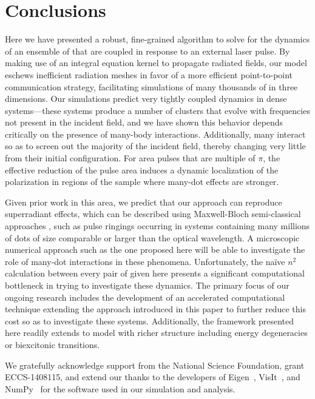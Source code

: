 \section{\label{section:conclusion}Conclusions}
Here we have presented a robust, fine-grained algorithm to solve for the dynamics of an ensemble of \qds{} that are coupled in response to an external laser pulse.
By making use of an integral equation kernel to propagate radiated fields, our model eschews inefficient radiation meshes in favor of a more efficient point-to-point communication strategy, facilitating simulations of many thousands of \qds{} in three dimensions.
Our simulations predict very tightly coupled dynamics in dense \qd{} systems---these systems produce a number of clusters that evolve with frequencies not present in the incident field, and we have shown this behavior depends critically on the presence of many-body interactions.
Additionally, many \qds{} interact so as to screen out the majority of the incident field, thereby changing very little from their initial configuration. For area pulses that are multiple of $\pi$, the effective reduction of the pulse area induces a dynamic localization of the polarization in regions of the sample where many-dot effects are stronger.

Given prior work in this area, we predict that our approach can reproduce superradiant effects, which can be described using Maxwell-Bloch semi-classical approaches \cite{Gross1982}, such as pulse ringings \cite{Burnham1969,MacGillivray1976} occurring in systems containing many millions of dots of size comparable or larger than the optical wavelength.
A microscopic numerical approach such as the one proposed here will be able to investigate the role of many-dot interactions in these phenomena.
Unfortunately, the na\"ive $n^2$ calculation between every pair of \qds{} given here presents a significant computational bottleneck in trying to investigate these dynamics.
The primary focus of our ongoing research includes the development of an accelerated computational technique extending the approach introduced in this paper to further reduce this cost so as to investigate these systems.
Additionally, the framework presented here readily extends to model \qds{} with richer structure including energy degeneracies or biexcitonic transitions.

\acknowledgments
We gratefully acknowledge support from the National Science Foundation, grant ECCS-1408115, and extend our thanks to the developers of
Eigen~\cite{Eigen}, VisIt~\cite{VisIt}, and NumPy~\cite{NumPy,SciPy} for the software used in our simulation and analysis.
